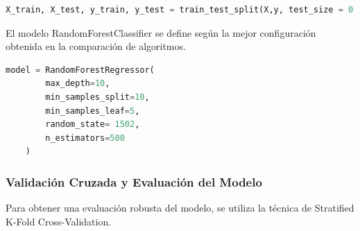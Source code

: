 \begin{lstlisting}[language=Python, caption=División de datos para entrenamiento y prueba, label=lst:train_test_split_RFC]
    X_train, X_test, y_train, y_test = train_test_split(X,y, test_size = 0.2,random_state= 1502)
\end{lstlisting}

El modelo RandomForestClassifier se define según la mejor configuración obtenida en la comparación de algoritmos.


\begin{lstlisting}[language=Python, caption=Definición del modelo RandomForestRegressor, label=lst:def_RFC]
    model = RandomForestRegressor( 
        max_depth=10, 
        min_samples_split=10, 
        min_samples_leaf=5,
        random_state= 1502,
        n_estimators=500
    )
\end{lstlisting}

\subsubsection{Validación Cruzada y Evaluación del Modelo}

Para obtener una evaluación robusta del modelo, se utiliza la técnica de Stratified K-Fold Cross-Validation.

